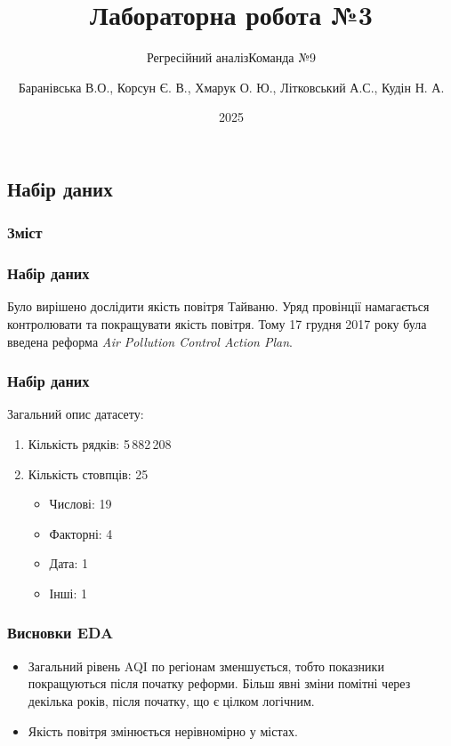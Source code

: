 ﻿\documentclass{beamer}
\title{Лабораторна робота №3}
\subtitle{Регресійний аналіз}
\subtitle{Команда №9}
\author[]{
  Баранівська В.О.,
  Корсун Є. В.,
  Хмарук О. Ю.,
  Літковський А.С.,
  Кудін Н. А.
}
\date{2025}
\begin{document}
\frame{\titlepage}

\graphicspath{{../../../}} %


\begin{frame}
  \section{Набір даних}

  \frametitle{Зміст}
  \tableofcontents[currentsection]
\end{frame}

\begin{frame}
  \frametitle{Набір даних}

  Було вирішено дослідити якість повітря Тайваню. Уряд провінції намагається
  контролювати та покращувати якість повітря. Тому 17 грудня 2017 року була введена
  реформа \textit{Air Pollution Control Action Plan}.

  \begin{center}

  \end{center}
\end{frame}

\begin{frame}
  \frametitle{Набір даних}

  Загальний опис датасету:

  \begin{enumerate}
    \item Кількість рядків: 5\,882\,208
    \item Кількість стовпців: 25

    \begin{itemize}
      \item Числові: 19
      \item Факторні: 4
      \item Дата: 1
      \item Інші: 1
    \end{itemize}
  \end{enumerate}
\end{frame}

\begin{frame}
  \frametitle{Висновки EDA}
   \begin{itemize}

  \item Загальний рівень AQI по регіонам зменшується, тобто показники покращуються після початку реформи.
  Більш явні зміни помітні через декілька років, після початку, що є цілком логічним.
  \item Якість повітря змінюється нерівномірно у містах.

  \end{itemize}
\end{frame}
\end{document}
